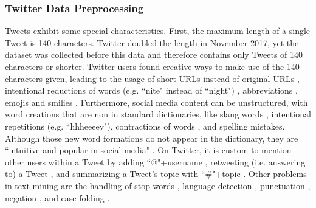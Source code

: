 \subsubsection{Twitter Data Preprocessing}
\label{subsubsec:tweet_cleaning}
Tweets exhibit some special characteristics. First, the maximum length of a single Tweet is 140 characters. Twitter doubled the length in November 2017, yet the dataset was collected before this data and therefore contains only Tweets of 140 characters or shorter. Twitter users found creative ways to make use of the 140 characters given, leading to the usage of short URLs instead of original URLs \cite{xiang2012detecting}, intentional reductions of words (e.g. ``nite" instead of ``night") \cite{xiang2012detecting}, abbreviations \cite{gupta2018proposed}, emojis \cite{ghorai2016information} \cite{watanabe2018hate} and smilies \cite{smailovic2013predictive} \cite{hovelmann2017fasttext}.\newline
Furthermore, social media content can be unstructured, with word creations that are non in standard dictionaries, like slang words \cite{gupta2018proposed} \cite{watanabe2018hate}, intentional repetitions \cite{xiang2012detecting} \cite{hemalatha2012preprocessing} \cite{montani2018tuwienkbs} \cite{rother2018ulmfit} (e.g. ``hhheeeey"), contractions of words \cite{smailovic2013predictive} \cite{hemalatha2012preprocessing}, and spelling mistakes. Although those new word formations do not appear in the dictionary, they are ``intuitive and popular in social media" \cite{hu2012text}. \newline
On Twitter, it is custom to mention other users within a Tweet by adding ``@"+username \cite{xiang2012detecting} \cite{montani2018tuwienkbs} \cite{watanabe2018hate} \cite{rother2018ulmfit}, retweeting (i.e. answering to) a Tweet \cite{xiang2012detecting} \cite{hemalatha2012preprocessing}, and summarizing a Tweet's topic with ``\#"+topic \cite{xiang2012detecting} \cite{watanabe2018hate}. \newline
Other problems in text mining are the handling of stop words \cite{xiang2012detecting} \cite{ghorai2016information} \cite{gupta2018proposed}, language detection \cite{xiang2012detecting}, punctuation \cite{ghorai2016information} \cite{hemalatha2012preprocessing} \cite{montani2018tuwienkbs}, negation \cite{watanabe2018hate}, and case folding \cite{ghorai2016information} \cite{gupta2018proposed} \cite{rother2018ulmfit}.\newline
